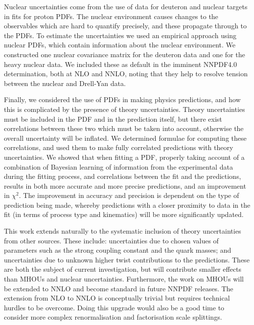 Nuclear uncertainties come from the use of data for deuteron and nuclear targets in fits for proton PDFs. The nuclear environment causes changes to the observables which are hard to quantify precisely, and these propagate through to the PDFs. To estimate the uncertainties we used an empirical approach using nuclear PDFs, which contain information about the nuclear environment. We constructed one nuclear covariance matrix for the deuteron data and one for the heavy nuclear data. We included these as default in the imminent NNPDF4.0 determination, both at NLO and NNLO, noting that they help to resolve tension between the nuclear and Drell-Yan data. 

Finally, we considered the use of PDFs in making physics predictions, and how this is complicated by the presence of theory uncertainties. Theory uncertainties must be included in the PDF and in the prediction itself, but there exist correlations between these two which must be taken into account, otherwise the overall uncertainty will be inflated. We determined formulae for computing these correlations, and used them to make fully correlated predictions with theory uncertainties. We showed that when fitting a PDF, properly taking account of a combination of Bayesian learning of information from the experimental data during the fitting process, and correlations between the fit and the predictions, results in both more accurate and more precise predictions, and an improvement in $\chi^2$. The improvement in accuracy and precision is dependent on the type of prediction being made, whereby predictions with a closer proximity to data in the fit (in terms of process type and kinematics) will be more significantly updated.

This work extends naturally to the systematic inclusion of theory uncertainties from other sources. These include: uncertainties due to chosen values of parameters such as the strong coupling constant and the quark masses; and uncertainties due to unknown higher twist contributions to the predictions. These are both the subject of current investigation, but will contribute smaller effects than MHOUs and nuclear uncertainties. Furthermore, the work on MHOUs will be extended to NNLO and become standard in future NNPDF releases. The extension from NLO to NNLO is conceptually trivial but requires technical hurdles to be overcome. Doing this upgrade would also be a good time to consider more complex renormalisation and factorisation scale splittings. 